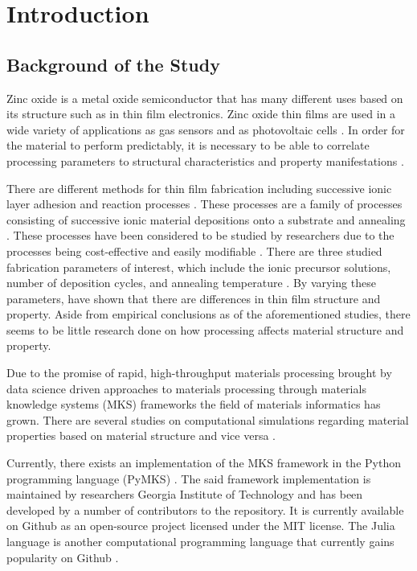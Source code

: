 \chapter{Introduction}
\section{Background of the Study}
Zinc oxide is a metal oxide semiconductor that has many different uses based on its structure such as in thin film electronics.
Zinc oxide thin films are used in a wide variety of applications as gas sensors \cite{florido17} and as photovoltaic cells \cite{fetsense}.
In order for the material to perform predictably, it is necessary to be able to correlate processing parameters to structural characteristics and property manifestations \cite{florido17, fetsense}.

There are different methods for thin film fabrication including successive ionic layer adhesion and reaction processes \cite{florido17}.
These processes are a family of processes consisting of successive ionic material depositions onto a substrate and annealing \cite{gao08}.
These processes have been considered to be studied by researchers due to the processes being cost-effective and easily modifiable \cite{gao08, vargas08, vargas2}.
There are three studied fabrication parameters of interest, which include the ionic precursor solutions, number of deposition cycles, and annealing temperature \cite{gao08,vargas08}.
By varying these parameters,  have shown that there are differences in thin film structure and property.
Aside from empirical conclusions as of the aforementioned studies, there seems to be little research done on how processing affects material structure and property.

Due to the promise of rapid, high-throughput materials processing brought by data science driven approaches to materials processing through materials knowledge systems (MKS) frameworks \cite{gupta15, sun17, yabansu14} the field of materials informatics has grown.
There are several studies on computational simulations regarding material properties based on material structure and vice versa \cite{gupta15, yabansu14}.

Currently, there exists an implementation of the MKS framework in the Python programming language (PyMKS) \cite{pymks}. The said framework implementation is maintained by researchers Georgia Institute of Technology and has been developed by a number of contributors to the repository.
It is currently available on Github as an open-source project licensed under the MIT license.
The Julia language is another computational programming language that currently gains popularity on Github \cite{julia15}.

